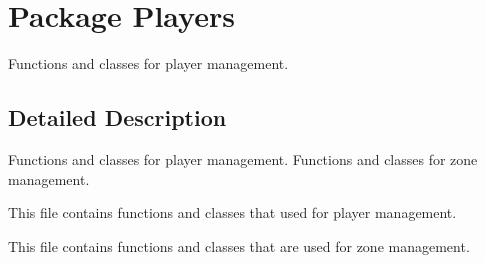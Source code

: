 \hypertarget{namespace_players}{
\section{Package Players}
\label{namespace_players}
}


Functions and classes for player management.  




\subsection{Detailed Description}
Functions and classes for player management. Functions and classes for zone management.

This file contains functions and classes that used for player management.

This file contains functions and classes that are used for zone management. 